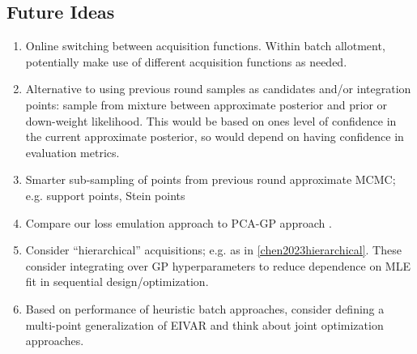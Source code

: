 \documentclass[12pt]{article}
\begin{document}
\begin{enumerate}
\subsection{Future Ideas}
\begin{enumerate}
\item Online switching between acquisition functions. Within batch allotment, potentially make use of different acquisition functions as needed. 
\item Alternative to using previous round samples as candidates and/or integration points: sample from mixture between approximate posterior and prior or 
down-weight likelihood. This would be based on ones level of confidence in the current approximate posterior, so would depend on having confidence 
in evaluation metrics. 
\item Smarter sub-sampling of points from previous round approximate MCMC; e.g. support points, Stein points
\item Compare our loss emulation approach to PCA-GP approach \cite{Higdon}. 
\item Consider ``hierarchical'' acquisitions; e.g. as in \ref{chen2023hierarchical}. These consider integrating over GP hyperparameters to reduce dependence 
on MLE fit in sequential design/optimization. 
\item Based on performance of heuristic batch approaches, consider defining a multi-point generalization of EIVAR and think about joint optimization approaches. 
\end{enumerate}




\end{enumerate}


 

\end{document}
